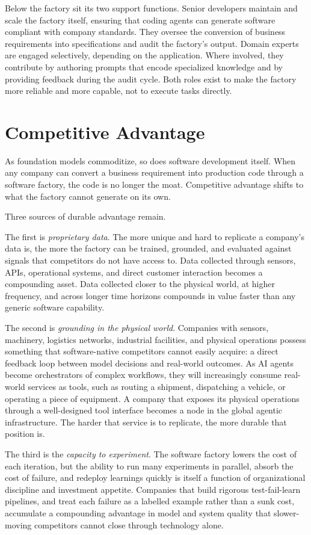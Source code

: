 Below the factory sit its two support functions. Senior developers maintain and scale the factory itself, ensuring that coding agents can generate software compliant with company standards. They oversee the conversion of business requirements into specifications and audit the factory's output. Domain experts are engaged selectively, depending on the application. Where involved, they contribute by authoring prompts that encode specialized knowledge and by providing feedback during the audit cycle. Both roles exist to make the factory more reliable and more capable, not to execute tasks directly.

\section{Competitive Advantage}

As foundation models commoditize, so does software development itself. When any company can convert a business requirement into production code through a software factory, the code is no longer the moat. Competitive advantage shifts to what the factory cannot generate on its own.

Three sources of durable advantage remain.

The first is \textit{proprietary data}. The more unique and hard to replicate a company's data is, the more the factory can be trained, grounded, and evaluated against signals that competitors do not have access to. Data collected through sensors, APIs, operational systems, and direct customer interaction becomes a compounding asset. Data collected closer to the physical world, at higher frequency, and across longer time horizons compounds in value faster than any generic software capability.

The second is \textit{grounding in the physical world}. Companies with sensors, machinery, logistics networks, industrial facilities, and physical operations possess something that software-native competitors cannot easily acquire: a direct feedback loop between model decisions and real-world outcomes. As AI agents become orchestrators of complex workflows, they will increasingly consume real-world services as tools, such as routing a shipment, dispatching a vehicle, or operating a piece of equipment. A company that exposes its physical operations through a well-designed tool interface becomes a node in the global agentic infrastructure. The harder that service is to replicate, the more durable that position is.

The third is the \textit{capacity to experiment}. The software factory lowers the cost of each iteration, but the ability to run many experiments in parallel, absorb the cost of failure, and redeploy learnings quickly is itself a function of organizational discipline and investment appetite. Companies that build rigorous test-fail-learn pipelines, and treat each failure as a labelled example rather than a sunk cost, accumulate a compounding advantage in model and system quality that slower-moving competitors cannot close through technology alone.
